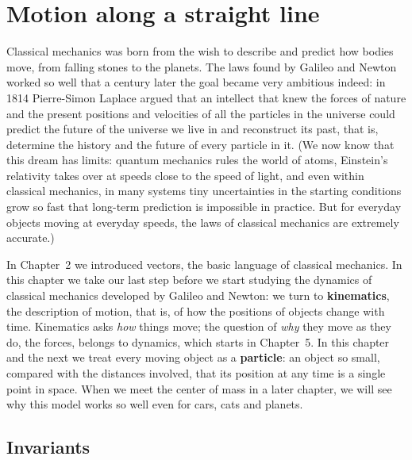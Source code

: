 \documentclass[11pt,a4paper]{article}
\begin{document}
\makenotetitle

\setcounter{section}{2}
\section{Motion along a straight line}\label{sec:line}

Classical mechanics was born from the wish to describe and predict how bodies move, from falling
stones to the planets. The laws found by Galileo and Newton worked so well that a century later
the goal became very ambitious indeed: in 1814 Pierre-Simon Laplace argued that an intellect that
knew the forces of nature and the present positions and velocities of all the particles in the
universe could predict the future of the universe we live in and reconstruct its past, that is,
determine the history and the future of every particle in it. (We now know that this dream has
limits: quantum mechanics rules the world of atoms, Einstein's relativity takes over at speeds
close to the speed of light, and even within classical mechanics, in many systems tiny
uncertainties in the starting conditions grow so fast that long-term prediction is impossible in
practice. But for everyday objects moving at everyday speeds, the laws of classical mechanics are
extremely accurate.)

In Chapter~2 we introduced vectors, the basic language of classical mechanics. In this chapter we
take our last step before we start studying the dynamics of classical mechanics developed by
Galileo and Newton: we turn to \textbf{kinematics}, the description of motion, that is, of how the
positions of objects change with time. Kinematics asks \emph{how} things move; the question of
\emph{why} they move as they do, the forces, belongs to dynamics, which starts in Chapter~5. In
this chapter and the next we treat every moving object as a \textbf{particle}: an object so
small, compared with the distances involved, that its position at any time is a single point in
space. When we meet the center of mass in a later
chapter, we will see why this model works so well even for cars, cats and planets.

\subsection{Invariants}\label{sec:invariants}
\end{document}
